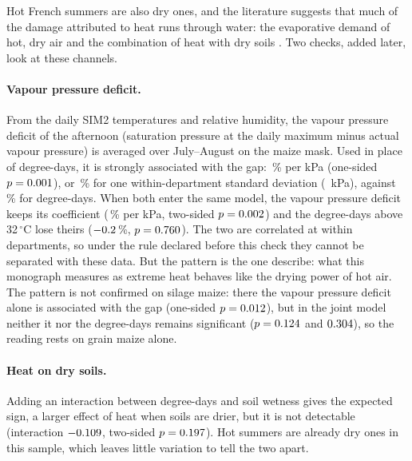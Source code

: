 Hot French summers are also dry ones, and the literature suggests that much of the damage attributed to heat runs through water: the evaporative demand of hot, dry air \parencite{lobell2013} and the combination of heat with dry soils \parencite{haqiqi2021,lesk2022}. Two checks, added later, look at these channels.

\paragraph{Vapour pressure deficit.} From the daily SIM2 temperatures and relative humidity, the vapour pressure deficit of the afternoon (saturation pressure at the daily maximum minus actual vapour pressure) is averaged over July--August on the maize mask. Used in place of degree-days, it is strongly associated with the gap: \VpdPct\,\% per kPa (one-sided $p = 0.001$), or \VpdSdEffect\,\% for one within-department standard deviation (\VpdSd~kPa), against \SimSdEffect\,\% for degree-days. When both enter the same model, the vapour pressure deficit keeps its coefficient (\VpdJointPct\,\% per kPa, two-sided $p = 0.002$) and the degree-days above 32\,$^{\circ}$C lose theirs ($-0.2$\,\%, $p = 0.760$). The two are correlated at \VpdCorr{} within departments, so under the rule declared before this check they cannot be separated with these data. But the pattern is the one \textcite{lobell2013} describe: what this monograph measures as extreme heat behaves like the drying power of hot air. The pattern is not confirmed on silage maize: there the vapour pressure deficit alone is associated with the gap (one-sided $p = 0.012$), but in the joint model neither it nor the degree-days remains significant ($p = 0.124$ and $0.304$), so the reading rests on grain maize alone.

\paragraph{Heat on dry soils.} Adding an interaction between degree-days and soil wetness gives the expected sign, a larger effect of heat when soils are drier, but it is not detectable (interaction $-0.109$, two-sided $p = 0.197$). Hot summers are already dry ones in this sample, which leaves little variation to tell the two apart.

